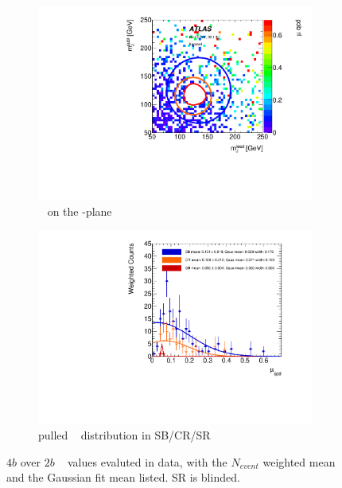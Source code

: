 \begin{figure}[htbp!]
\centering
\captionsetup{justification=centering}
	\hspace{-1cm}
    \begin{subfigure}[b]{0.4\textwidth}
        \includegraphics[width=\textwidth,angle=-90]{figures/boosted/AppendixMuqcdstudy/FourTag_Incl_mH0H1.pdf}
        \caption{\muqcd~ on the \mleadJ-\msublJ plane}
        \label{fig:app-muqcd-4b-2d}
    \end{subfigure}
    \quad \quad \quad \quad 
    \begin{subfigure}[b]{0.4\textwidth}
        \includegraphics[width=\textwidth,angle=-90]{figures/boosted/AppendixMuqcdstudy/FourTag_Incl_mH0H1_pull.pdf}
        \caption{pulled \muqcd~ distribution in SB/CR/SR}
        \label{fig:app-muqcd-4b-pull}
    \end{subfigure}
\caption{$4b$ over $2b$ \muqcd~ values evaluted in data, with the $N_{event}$ weighted mean and the Gaussian fit mean listed. SR is blinded.}
\label{fig:app-muqcd-4b}
\end{figure}

